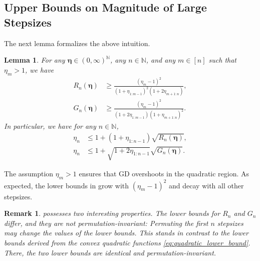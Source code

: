 \documentclass[11pt]{article}
\newcommand{\N}{\mathbb{N}}
\newcommand{\schedule}{\bm{\eta}}
\newtheorem{lemma}{Lemma}[section]
\newtheorem*{remark}{Remark}
\begin{document}
\subsection{Upper Bounds on Magnitude of Large Stepsizes}

The next lemma formalizes the above intuition.

\begin{lemma}\label{lem:asymmetric_huber}
For any $\schedule\in(0,\infty)^{\N}$, any $n\in\N$, and any $m\in[n]$ such that $\eta_m > 1$, we have
\begin{equation}\label{eq:asymmetric_huber_part_i}
\begin{split}
	R_n(\schedule) &\geq \frac{ (\eta_m-1)^2 }{ ( 1 + \eta_{1:m-1} )^2 ( 1 + 2 \eta_{m+1:n} ) }, \\
	G_n(\schedule) &\geq \frac{ (\eta_m-1)^2 }{ ( 1 + 2 \eta_{1:m-1} ) ( 1 + \eta_{m+1:n} )^2 }.
\end{split}
\end{equation}
In particular, we have for any $n\in\N$,
\begin{equation}\label{eq:asymmetric_huber_part_ii}
\begin{split}
	\eta_n &\leq 1 + (1 + \eta_{1:n-1})\sqrt{R_n(\schedule)}, \\
	\eta_n &\leq 1 + \sqrt{1 + 2\eta_{1:n-1}}\sqrt{G_n(\schedule)}.
\end{split}
\end{equation}
\end{lemma}

The assumption $\eta_m>1$ ensures that GD overshoots in the quadratic region.
As expected, the lower bounds in  grow with $(\eta_m-1)^2$ and decay with all other stepsizes.


\begin{remark}
 possesses two interesting properties.
The lower bounds for $R_n$ and $G_n$ differ, and they are \emph{not} permutation-invariant:
Permuting the first $n$ stepsizes may change the values of the lower bounds.
This stands in contrast to the lower bounds derived from the convex quadratic functions \eqref{eq:quadratic_lower_bound}.
There, the two lower bounds are identical and permutation-invariant.
\end{remark}
\end{document}
